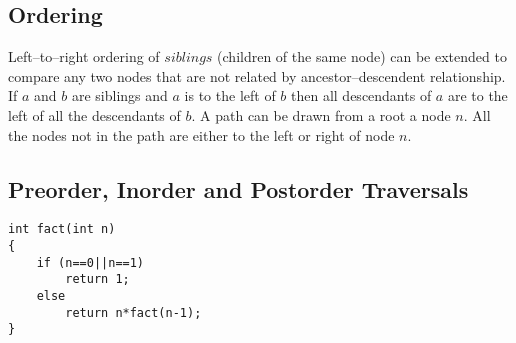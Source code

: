 \documentclass[12pt,a4paper]{article}
\begin{document}
\begin{itemize}
\subsection{Ordering}
Left--to--right ordering of $siblings$ (children of the same node) can be extended to compare any two nodes that are not related by ancestor--descendent relationship. If $a$ and $b$ are siblings and $a$ is to the left of $b$ then all descendants of $a$ are to the left of all the descendants of $b$. A path can be drawn from a root a node $n$. All the nodes not in the path are either to the left or right of node $n$.
\subsection{Preorder, Inorder and Postorder Traversals}
\end{itemize}
\begin{lstlisting}
int fact(int n)
{
    if (n==0||n==1)
        return 1;
    else
        return n*fact(n-1);
}
\end{lstlisting}


\end{document}
